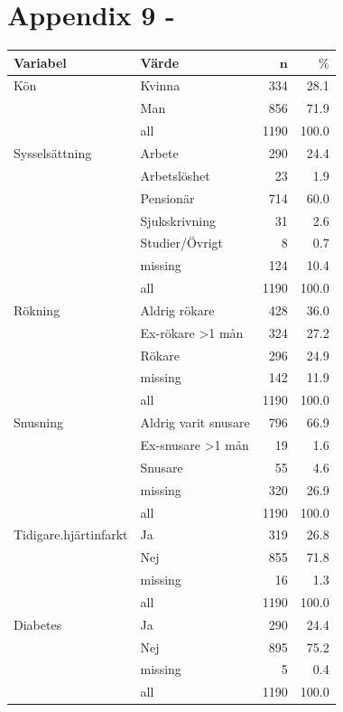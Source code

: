 \newpage
\section{Appendix 9 - }

\begin{table}[ht]
\centering
{\footnotesize
\begin{tabular}{ll|rr}
 \textbf{Variabel} & \textbf{Värde} & $\mathbf{n}$ & $\mathbf{\%}$ \\ 
  \hline
Kön & Kvinna & 334 & 28.1 \\ 
   & Man & 856 & 71.9 \\ 
   \hline
 & all & 1190 & 100.0 \\ 
   \hline
\hline
Sysselsättning & Arbete & 290 & 24.4 \\ 
   & Arbetslöshet & 23 & 1.9 \\ 
   & Pensionär & 714 & 60.0 \\ 
   & Sjukskrivning & 31 & 2.6 \\ 
   & Studier/Övrigt & 8 & 0.7 \\ 
   & missing & 124 & 10.4 \\ 
   \hline
 & all & 1190 & 100.0 \\ 
   \hline
\hline
Rökning & Aldrig rökare & 428 & 36.0 \\ 
   & Ex-rökare >1 mån & 324 & 27.2 \\ 
   & Rökare & 296 & 24.9 \\ 
   & missing & 142 & 11.9 \\ 
   \hline
 & all & 1190 & 100.0 \\ 
   \hline
\hline
Snusning & Aldrig varit snusare & 796 & 66.9 \\ 
   & Ex-snusare >1 mån & 19 & 1.6 \\ 
   & Snusare & 55 & 4.6 \\ 
   & missing & 320 & 26.9 \\ 
   \hline
 & all & 1190 & 100.0 \\ 
   \hline
\hline
Tidigare.hjärtinfarkt & Ja & 319 & 26.8 \\ 
   & Nej & 855 & 71.8 \\ 
   & missing & 16 & 1.3 \\ 
   \hline
 & all & 1190 & 100.0 \\ 
   \hline
\hline
Diabetes & Ja & 290 & 24.4 \\ 
   & Nej & 895 & 75.2 \\ 
   & missing & 5 & 0.4 \\ 
   \hline
 & all & 1190 & 100.0 \\ 

\end{tabular}}
\end{table}
